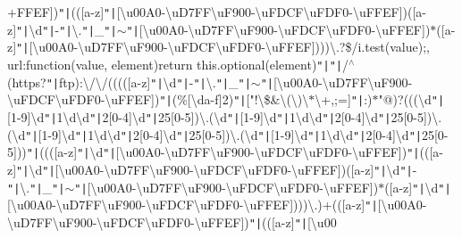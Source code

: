 +F\+F\+E\+F])\texttt{"|}(([a-\/z]\texttt{"|}[\textbackslash{}u00\+A0-\/\textbackslash{}u\+D7\+F\+F\textbackslash{}u\+F900-\/\textbackslash{}u\+F\+D\+C\+F\textbackslash{}u\+F\+D\+F0-\/\textbackslash{}u\+F\+F\+E\+F])([a-\/z]\texttt{"|}\textbackslash{}d\texttt{"|}-\/\texttt{"|}\textbackslash{}.\texttt{"|}\+\_\+\texttt{"|}$\sim$\texttt{"|}[\textbackslash{}u00\+A0-\/\textbackslash{}u\+D7\+F\+F\textbackslash{}u\+F900-\/\textbackslash{}u\+F\+D\+C\+F\textbackslash{}u\+F\+D\+F0-\/\textbackslash{}u\+F\+F\+E\+F])$\ast$([a-\/z]\texttt{"|}[\textbackslash{}u00\+A0-\/\textbackslash{}u\+D7\+F\+F\textbackslash{}u\+F900-\/\textbackslash{}u\+F\+D\+C\+F\textbackslash{}u\+F\+D\+F0-\/\textbackslash{}u\+F\+F\+E\+F])))\textbackslash{}.?\$/i.\+test(value);\rcurly{}, url\+:function(value, element)\lcurly{}return this.\+optional(element)\texttt{"|}\texttt{"|}/$^\wedge$(https?\texttt{"|}ftp)\+:\textbackslash{}/\textbackslash{}/(((([a-\/z]\texttt{"|}\textbackslash{}d\texttt{"|}-\/\texttt{"|}\textbackslash{}.\texttt{"|}\+\_\+\texttt{"|}$\sim$\texttt{"|}[\textbackslash{}u00\+A0-\/\textbackslash{}u\+D7\+F\+F\textbackslash{}u\+F900-\/\textbackslash{}u\+F\+D\+C\+F\textbackslash{}u\+F\+D\+F0-\/\textbackslash{}u\+F\+F\+E\+F])\texttt{"|}(\%[\textbackslash{}da-\/f]\lcurly{}2\rcurly{})\texttt{"|}["!\textbackslash{}\$\&\textquotesingle{}\textbackslash{}(\textbackslash{})\textbackslash{}$\ast$\textbackslash{}+,;=]\texttt{"|}\+:)$\ast$"@)?(((\textbackslash{}d\texttt{"|}[1-\/9]\textbackslash{}d\texttt{"|}1\textbackslash{}d\textbackslash{}d\texttt{"|}2[0-\/4]\textbackslash{}d\texttt{"|}25[0-\/5])\textbackslash{}.(\textbackslash{}d\texttt{"|}[1-\/9]\textbackslash{}d\texttt{"|}1\textbackslash{}d\textbackslash{}d\texttt{"|}2[0-\/4]\textbackslash{}d\texttt{"|}25[0-\/5])\textbackslash{}.(\textbackslash{}d\texttt{"|}[1-\/9]\textbackslash{}d\texttt{"|}1\textbackslash{}d\textbackslash{}d\texttt{"|}2[0-\/4]\textbackslash{}d\texttt{"|}25[0-\/5])\textbackslash{}.(\textbackslash{}d\texttt{"|}[1-\/9]\textbackslash{}d\texttt{"|}1\textbackslash{}d\textbackslash{}d\texttt{"|}2[0-\/4]\textbackslash{}d\texttt{"|}25[0-\/5]))\texttt{"|}((([a-\/z]\texttt{"|}\textbackslash{}d\texttt{"|}[\textbackslash{}u00\+A0-\/\textbackslash{}u\+D7\+F\+F\textbackslash{}u\+F900-\/\textbackslash{}u\+F\+D\+C\+F\textbackslash{}u\+F\+D\+F0-\/\textbackslash{}u\+F\+F\+E\+F])\texttt{"|}(([a-\/z]\texttt{"|}\textbackslash{}d\texttt{"|}[\textbackslash{}u00\+A0-\/\textbackslash{}u\+D7\+F\+F\textbackslash{}u\+F900-\/\textbackslash{}u\+F\+D\+C\+F\textbackslash{}u\+F\+D\+F0-\/\textbackslash{}u\+F\+F\+E\+F])([a-\/z]\texttt{"|}\textbackslash{}d\texttt{"|}-\/\texttt{"|}\textbackslash{}.\texttt{"|}\+\_\+\texttt{"|}$\sim$\texttt{"|}[\textbackslash{}u00\+A0-\/\textbackslash{}u\+D7\+F\+F\textbackslash{}u\+F900-\/\textbackslash{}u\+F\+D\+C\+F\textbackslash{}u\+F\+D\+F0-\/\textbackslash{}u\+F\+F\+E\+F])$\ast$([a-\/z]\texttt{"|}\textbackslash{}d\texttt{"|}[\textbackslash{}u00\+A0-\/\textbackslash{}u\+D7\+F\+F\textbackslash{}u\+F900-\/\textbackslash{}u\+F\+D\+C\+F\textbackslash{}u\+F\+D\+F0-\/\textbackslash{}u\+F\+F\+E\+F])))\textbackslash{}.)+(([a-\/z]\texttt{"|}[\textbackslash{}u00\+A0-\/\textbackslash{}u\+D7\+F\+F\textbackslash{}u\+F900-\/\textbackslash{}u\+F\+D\+C\+F\textbackslash{}u\+F\+D\+F0-\/\textbackslash{}u\+F\+F\+E\+F])\texttt{"|}(([a-\/z]\texttt{"|}[\textbackslash{}u00